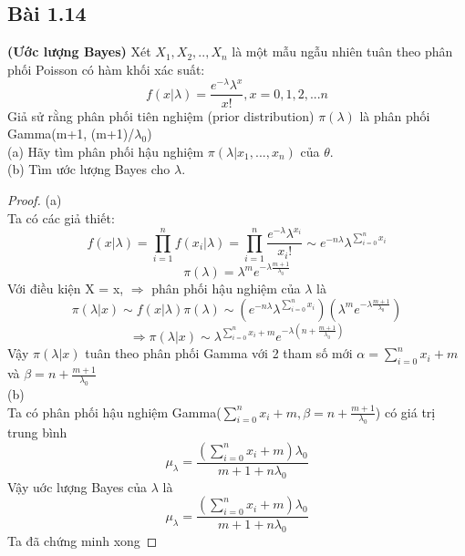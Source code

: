 \subsection{Bài 1.14}

\begin{problem}{1.14}
\textbf{(Ước lượng Bayes)} Xét $X_1, X_2,.., X_n$ là một mẫu ngẫu nhiên  tuân theo phân phối Poisson có hàm khối xác suất:
\begin{equation*}
f(x|\lambda)=\frac{e^{-\lambda}\lambda^x}{x!} , x=0, 1, 2,... n
\end{equation*}
Giả sử rằng phân phối tiên nghiệm (prior distribution) $\pi(\lambda)$ là phân phối Gamma(m+1, (m+1)/$\lambda_0$)\\
(a) Hãy tìm phân phối hậu nghiệm $\pi(\lambda|x_1,...,x_n)$ của $\theta$.\\
(b) Tìm ước lượng Bayes cho $\lambda$.
\end{problem}

\begin{proof}
(a)\\
Ta có các giả thiết:
\begin{equation*}
f(x|\lambda)=\prod_{i=1}^nf(x_i|\lambda)=\prod_{i=1}^n\frac{e^{-\lambda}\lambda^{x_i}}{x_i!} \sim e^{-n\lambda}\lambda^{\sum_{i=0}^n{x_i}}
\end{equation*}
\begin{equation*}
\pi(\lambda) = \lambda^me^{-\lambda\frac{m+1}{\lambda_0}}
\end{equation*}
Với điều kiện X = x, $\Rightarrow$ phân phối hậu nghiệm của $\lambda$ là
\begin{equation*}
\pi(\lambda|x)\sim f(x|\lambda)\pi(\lambda)\sim (e^{-n\lambda}\lambda^{\sum_{i=0}^n{x_i}})(\lambda^me^{-\lambda\frac{m+1}{\lambda_0}})
\end{equation*}
\begin{equation*}
\Rightarrow\pi(\lambda|x)\sim \lambda^{\sum_{i=0}^n{x_i}+m}e^{-\lambda(n+\frac{m+1}{\lambda_0})}
\end{equation*}
Vậy $\pi(\lambda|x)$ tuân theo phân phối Gamma với 2 tham số mới $\alpha = \sum_{i=0}^n{x_i}+m$  và $\beta=n+\frac{m+1}{\lambda_0}$\\
(b) \\
Ta có phân phối hậu nghiệm Gamma($\sum_{i=0}^n{x_i}+m, \beta=n+\frac{m+1}{\lambda_0}$) có giá trị trung bình
\begin{equation*}
\mu_\lambda=\frac{(\sum_{i=0}^n{x_i}+m)\lambda_0}{m+1+n\lambda_0}
\end{equation*}
Vậy uớc lượng Bayes của $\lambda$ là
\begin{equation*}
\mu_\lambda=\frac{(\sum_{i=0}^n{x_i}+m)\lambda_0}{m+1+n\lambda_0}
\end{equation*}
Ta đã chứng minh xong
\end{proof}
